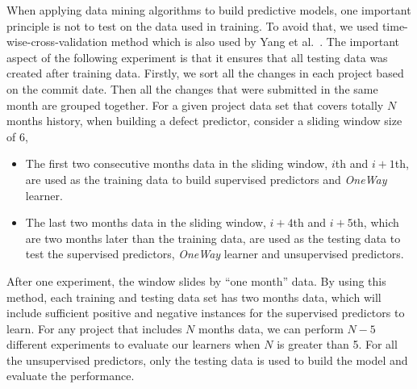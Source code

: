 \documentclass[sigconf]{acmart}
\theoremstyle{break}
\newcommand{\bi}{\begin{itemize}[leftmargin=0.4cm]}
\newcommand{\ei}{\end{itemize}}
\begin{document}
When applying data mining algorithms to build predictive models,
one important principle is not to test on the data used in training. 
To avoid that, we used time-wise-cross-validation method which is also used by Yang et al.~\cite{yang2016effort}.
The important aspect of the following experiment is that
it ensures   that all testing data was  
created after training data.
Firstly, we sort all the changes in each project based on the commit date. 
Then all the changes that were submitted in the same month are grouped together.
For a given project data set that covers totally $N$ months history, when building
a defect predictor, consider a sliding window size of $6$,
\bi 
\item The first two consecutive months data in the sliding window,  $i$th and $i+1$th, are used as the training data to build supervised predictors and {\it OneWay} learner.
\item The last two months data in the sliding window, $i+4$th and $i+5$th, which are
two months later than the training data, are used as
the testing data to test the supervised predictors, {\it OneWay} learner and unsupervised predictors.
\ei
After one experiment, the window slides by ``one month'' data. By using this method, each training and testing data set
has two months data, which will include sufficient positive and negative instances
for the supervised predictors to learn. For any project that includes $N$ months data,
we can perform $N-5$ different experiments to evaluate our learners when $N$ is greater than 5.
For all the unsupervised predictors, only the testing data 
is used to build the model and evaluate the performance.
\end{document}
